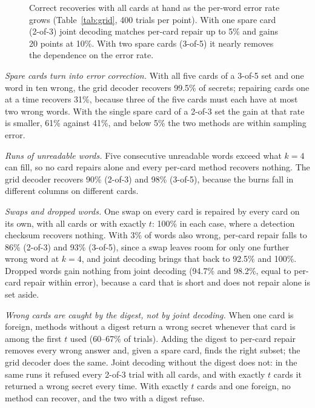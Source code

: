 \documentclass[numeric]{anvil-paper}
\begin{document}
\begin{figure}[tb]
\centering

\caption{Correct recoveries with all cards at hand as the per-word error rate
grows (Table~\ref{tab:grid}, 400 trials per point). With one spare card
(2-of-3) joint decoding matches per-card repair up to 5\% and gains 20 points
at 10\%. With two spare cards (3-of-5) it nearly removes the dependence on
the error rate.}
\label{fig:rates}
\end{figure}

\emph{Spare cards turn into error correction.} With all five cards of a 3-of-5
set and one word in ten wrong, the grid decoder recovers 99.5\% of secrets;
repairing cards one at a time recovers 31\%, because three of the five cards
must each have at most two wrong words. With the single spare card of a 2-of-3
set the gain at that rate is smaller, 61\% against 41\%, and below 5\% the two
methods are within sampling error.

\emph{Runs of unreadable words.} Five consecutive unreadable words exceed what
$k=4$ can fill, so no card repairs alone and every per-card method recovers
nothing. The grid decoder recovers 90\% (2-of-3) and 98\% (3-of-5), because
the burns fall in different columns on different cards.

\emph{Swaps and dropped words.} One swap on every card is repaired by every card
on its own, with all cards or with exactly $t$: 100\% in each case, where a
detection checksum recovers nothing. With 3\% of words also wrong, per-card
repair falls to 86\% (2-of-3) and 93\% (3-of-5), since a swap leaves room for
only one further wrong word at $k=4$, and joint decoding brings that back to
92.5\% and 100\%. Dropped words gain nothing from joint decoding (94.7\% and
98.2\%, equal to per-card repair within error), because a card that is short
and does not repair alone is set aside.

\emph{Wrong cards are caught by the digest, not by joint decoding.} When one
card is foreign, methods without a digest return a wrong secret whenever that
card is among the first $t$ used (60--67\% of trials). Adding the digest to per-card repair removes
every wrong answer and, given a spare card, finds the right subset; the grid
decoder does the same. Joint decoding without the digest does not: in
the same runs it refused every 2-of-3 trial with all cards, and with exactly
$t$ cards it returned a wrong secret every time. With exactly $t$ cards and one foreign,
no method can recover, and the two with a digest refuse.
\end{document}
